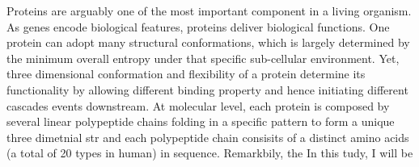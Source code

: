 Proteins are arguably one of the most important component in a living organism. As genes encode biological features, proteins deliver biological functions. One protein can adopt many structural conformations, which is largely determined by the minimum overall entropy under that specific sub-cellular environment. Yet, three dimensional conformation and flexibility of a protein determine its functionality by allowing different binding property and hence initiating different cascades events downstream. At molecular level, each protein is composed by several linear polypeptide chains folding in a specific pattern to form a unique three dimetnial str and each polypeptide chain consisits of a distinct amino acids (a total of 20 types in human) in sequence. Remarkbily, the  In this tudy, I will be 